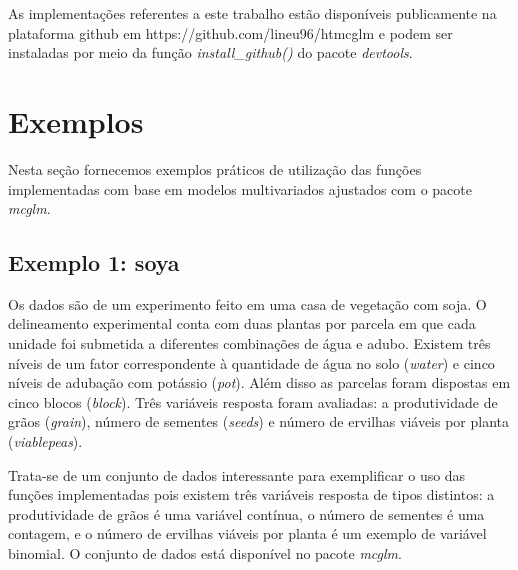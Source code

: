 As implementações referentes a este trabalho estão disponíveis publicamente na plataforma github em https://github.com/lineu96/htmcglm e podem ser instaladas por meio da função \emph{install\_github()} do pacote \emph{devtools}.

\begin{knitrout}
\color{fgcolor}\begin{kframe}
\begin{alltt}
\hlstd{(}\hlstd{)}
\end{alltt}
\end{kframe}
\end{knitrout}



\section{Exemplos}

Nesta seção fornecemos exemplos práticos de utilização das funções implementadas com base em modelos multivariados ajustados com o pacote \emph{mcglm}.

\subsection{Exemplo 1: soya}

Os dados são de um experimento feito em uma casa de vegetação com soja. O delineamento experimental conta com duas plantas por parcela em que cada unidade foi submetida a diferentes combinações de água e adubo. Existem três níveis de um fator correspondente à quantidade de água no solo (\emph{water}) e cinco níveis de adubação com potássio (\emph{pot}). Além disso as parcelas foram dispostas em cinco blocos (\emph{block}). Três variáveis resposta foram avaliadas: a produtividade de grãos (\emph{grain}), número de sementes (\emph{seeds}) e número de ervilhas viáveis por planta (\emph{viablepeas}).

Trata-se de um conjunto de dados interessante para exemplificar o uso das funções implementadas pois existem três variáveis resposta de tipos distintos: a produtividade de grãos é uma variável contínua, o número de sementes é uma contagem, e o número de ervilhas viáveis por planta é um exemplo de variável binomial. O conjunto de dados está disponível no pacote \emph{mcglm}.


